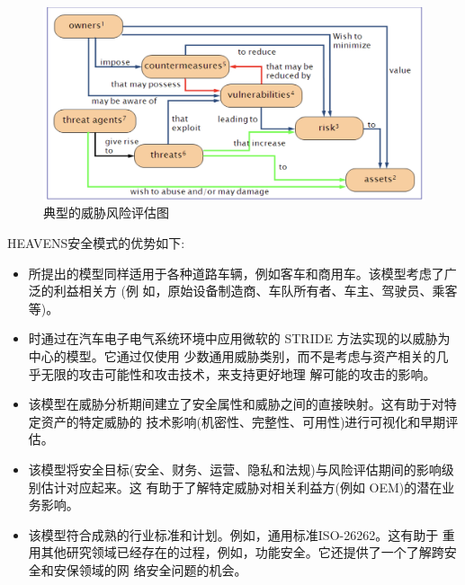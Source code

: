 \begin{figure}
    \centering
    \includegraphics[scale=0.6]{resources/img/i10.png}
    \caption{典型的威胁风险评估图}
  \end{figure}

  HEAVENS安全模式的优势如下:

  \begin{itemize}
    \item  所提出的模型同样适用于各种道路车辆，例如客车和商用车。该模型考虑了广泛的利益相关方 (例
    如，原始设备制造商、车队所有者、车主、驾驶员、乘客等)。
    \item  时通过在汽车电子电气系统环境中应用微软的 STRIDE 方法实现的以威胁为中心的模型。它通过仅使用
    少数通用威胁类别，而不是考虑与资产相关的几乎无限的攻击可能性和攻击技术，来支持更好地理
    解可能的攻击的影响。
    \item  该模型在威胁分析期间建立了安全属性和威胁之间的直接映射。这有助于对特定资产的特定威胁的
    技术影响(机密性、完整性、可用性)进行可视化和早期评估。
    \item 该模型将安全目标(安全、财务、运营、隐私和法规)与风险评估期间的影响级别估计对应起来。这
    有助于了解特定威胁对相关利益方(例如 OEM)的潜在业务影响。
    \item 该模型符合成熟的行业标准和计划。例如，通用标准ISO-26262。这有助于
    重用其他研究领域已经存在的过程，例如，功能安全。它还提供了一个了解跨安全和安保领域的网
    络安全问题的机会。
\end{itemize}

